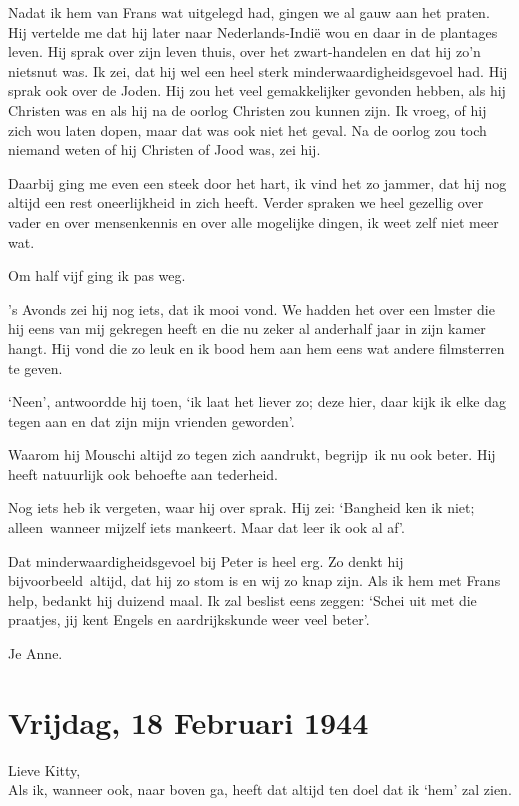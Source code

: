 \documentclass{book}
\begin{document}
Nadat ik hem van Frans wat uitgelegd had, gingen we al gauw aan het praten. Hij
vertelde me dat hij later naar Nederlands-Indië wou en daar in de plantages
leven. Hij sprak over zijn leven thuis, over het zwart-handelen en dat hij zo'n
nietsnut was. Ik zei, dat hij wel een heel sterk minderwaardigheidsgevoel had.
Hij sprak ook over de Joden.  Hij zou het veel gemakkelijker gevonden hebben,
als hij Christen was en als hij na de oorlog Christen zou kunnen zijn. Ik vroeg,
of hij zich wou laten dopen, maar dat was ook niet het geval. Na de oorlog zou
toch niemand weten of hij Christen of Jood was, zei hij.

Daarbij ging me even een steek door het hart, ik vind het zo jammer, dat hij nog
altijd een rest oneerlijkheid in zich heeft. Verder spraken we heel gezellig
over vader en over mensenkennis en over alle mogelijke dingen, ik weet zelf niet
meer wat.

Om half vijf ging ik pas weg.

's Avonds zei hij nog iets, dat ik mooi vond. We hadden het over een lmster die
hij eens van mij gekregen heeft en die nu zeker al anderhalf jaar in zijn kamer
hangt. Hij vond die zo leuk en ik bood hem aan hem eens wat andere filmsterren
te geven.

`Neen', antwoordde hij toen, `ik laat het liever zo; deze hier, daar kijk ik
elke dag tegen aan en dat zijn mijn vrienden geworden'.

Waarom hij Mouschi altijd zo tegen zich aandrukt, begrijp~ik nu ook beter. Hij
heeft natuurlijk ook behoefte aan tederheid.

Nog iets heb ik vergeten, waar hij over sprak. Hij zei: `Bangheid ken ik niet;
alleen~wanneer mijzelf iets mankeert. Maar dat leer ik ook al af'.

Dat minderwaardigheidsgevoel bij Peter is heel erg. Zo denkt hij
bijvoorbeeld~altijd, dat hij zo stom is en wij zo knap zijn. Als ik hem met
Frans help, bedankt hij duizend maal. Ik zal beslist eens zeggen: `Schei uit met
die praatjes, jij kent Engels en aardrijkskunde weer veel beter'.

Je Anne.

\section*{Vrijdag, 18 Februari 1944}

Lieve Kitty,\\
Als ik, wanneer ook, naar boven ga, heeft dat altijd ten doel dat
ik `hem' zal zien.
\end{document}
